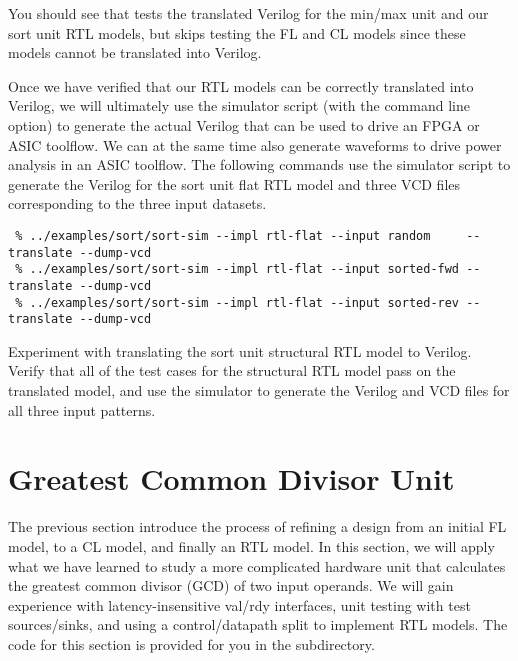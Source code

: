 \documentclass{cbxdoc}
\begin{document}
You should see that  tests the translated Verilog for the
min/max unit and our sort unit RTL models, but skips testing the FL and
CL models since these models cannot be translated into Verilog.

Once we have verified that our RTL models can be correctly translated
into Verilog, we will ultimately use the simulator script (with the
 command line option) to generate the actual Verilog
that can be used to drive an FPGA or ASIC toolflow. We can at the same
time also generate waveforms to drive power analysis in an ASIC toolflow.
The following commands use the simulator script to generate the Verilog
for the sort unit flat RTL model and three VCD files corresponding
to the three input datasets.

\begin{verbatim}
 % ../examples/sort/sort-sim --impl rtl-flat --input random     --translate --dump-vcd
 % ../examples/sort/sort-sim --impl rtl-flat --input sorted-fwd --translate --dump-vcd
 % ../examples/sort/sort-sim --impl rtl-flat --input sorted-rev --translate --dump-vcd
\end{verbatim}

\begin{task}
  Experiment with translating the sort unit structural RTL model to
  Verilog. Verify that all of the test cases for the structural RTL model
  pass on the translated model, and use the simulator to generate the
  Verilog and VCD files for all three input patterns.
\end{task}


\section{Greatest Common Divisor Unit}
\label{sec-gcd}

The previous section introduce the process of refining a design from an
initial FL model, to a CL model, and finally an RTL model. In this
section, we will apply what we have learned to study a more complicated
hardware unit that calculates the greatest common divisor (GCD) of two
input operands. We will gain experience with latency-insensitive val/rdy
interfaces, unit testing with test sources/sinks, and using a
control/datapath split to implement RTL models. The code for this section
is provided for you in the  subdirectory.
\end{document}
